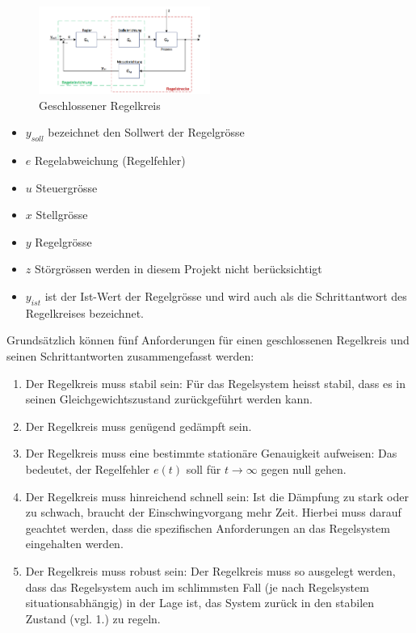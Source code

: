\begin{figure}[!h!, width=\pagewidth]
    \centering
    \includegraphics[width=0.5\textwidth]{images/geschlRegelkreis}
    \caption{Geschlossener Regelkreis}
    \label{fig:geschlossenerRegelkreis}
\end{figure}

\begin{itemize}
    \item
        $y_{soll}$ bezeichnet den Sollwert der Regelgr\"osse
    \item
        $e$ Regelabweichung (Regelfehler)
    \item
        $u$ Steuergr\"osse
    \item
        $x$ Stellgr\"osse
    \item
        $y$ Regelgr\"osse
    \item
        $z$ St\"orgr\"ossen werden in diesem Projekt nicht ber\"ucksichtigt
    \item
        $y_{ist}$ ist  der Ist-Wert  der Regelgr\"osse und  wird auch  als die
        Schrittantwort des Regelkreises bezeichnet.
\end{itemize}


Grunds\"atzlich  k\"onnen  f\"unf   Anforderungen  f\"ur  einen  geschlossenen
Regelkreis und seinen Schrittantworten zusammengefasst werden:
\begin{enumerate}
    \item
        Der Regelkreis muss stabil  sein: F\"ur das Regelsystem heisst stabil,
        dass es in seinen Gleichgewichtszustand zur\"uckgef\"uhrt werden kann.
    \item
        Der Regelkreis muss gen\"ugend ged\"ampft sein.
    \item
        Der   Regelkreis   muss   eine  bestimmte   station\"are   Genauigkeit
        aufweisen: Das   bedeutet,   der   Regelfehler   $e(t)$   soll   f\"ur
        $t\rightarrow\infty$ gegen null gehen.
    \item
        Der  Regelkreis  muss  hinreichend schnell  sein: Ist  die  D\"ampfung
        zu  stark   oder  zu  schwach,  braucht   der  Einschwingvorgang  mehr
        Zeit. Hierbei  muss  darauf  geachtet werden,  dass  die  spezifischen
        Anforderungen an das Regelsystem eingehalten werden.
    \item
        Der  Regelkreis muss  robust  sein: Der Regelkreis  muss so  ausgelegt
        werden,  dass  das  Regelsystem  auch im  schlimmsten  Fall  (je  nach
        Regelsystem situationsabh\"angig) in der Lage ist, das System zur\"uck
        in den stabilen Zustand (vgl. 1.) zu regeln.
\end{enumerate}



